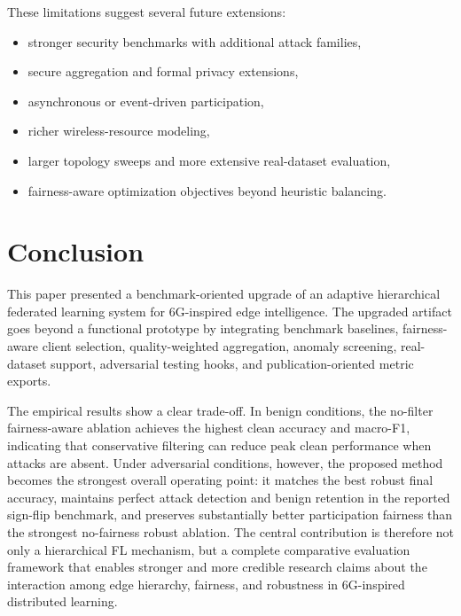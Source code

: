 \documentclass[conference]{IEEEtran}
\begin{document}
These limitations suggest several future extensions:
\begin{itemize}
    \item stronger security benchmarks with additional attack families,
    \item secure aggregation and formal privacy extensions,
    \item asynchronous or event-driven participation,
    \item richer wireless-resource modeling,
    \item larger topology sweeps and more extensive real-dataset evaluation,
    \item fairness-aware optimization objectives beyond heuristic balancing.
\end{itemize}

\section{Conclusion}
This paper presented a benchmark-oriented upgrade of an adaptive hierarchical federated learning system for 6G-inspired edge intelligence. The upgraded artifact goes beyond a functional prototype by integrating benchmark baselines, fairness-aware client selection, quality-weighted aggregation, anomaly screening, real-dataset support, adversarial testing hooks, and publication-oriented metric exports.

The empirical results show a clear trade-off. In benign conditions, the no-filter fairness-aware ablation achieves the highest clean accuracy and macro-F1, indicating that conservative filtering can reduce peak clean performance when attacks are absent. Under adversarial conditions, however, the proposed method becomes the strongest overall operating point: it matches the best robust final accuracy, maintains perfect attack detection and benign retention in the reported sign-flip benchmark, and preserves substantially better participation fairness than the strongest no-fairness robust ablation. The central contribution is therefore not only a hierarchical FL mechanism, but a complete comparative evaluation framework that enables stronger and more credible research claims about the interaction among edge hierarchy, fairness, and robustness in 6G-inspired distributed learning.
\end{document}
